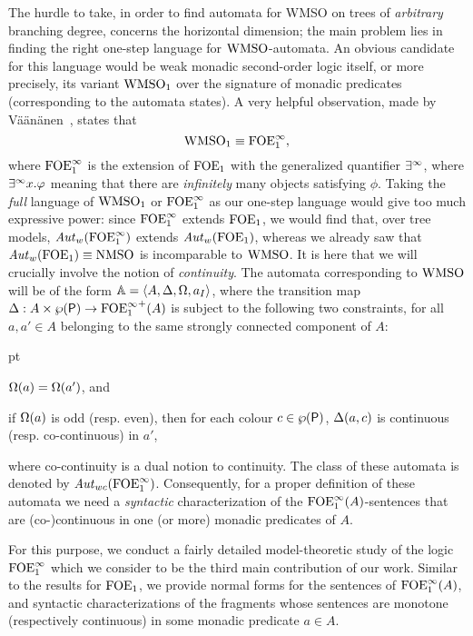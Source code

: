 The hurdle to take, in order to find automata for WMSO on trees of
\emph{arbitrary} branching degree, concerns the horizontal dimension; the
main problem lies in finding the right one-step language for
$\mathrm{WMSO}$-automata.
An obvious candidate for this language would be weak monadic second-order logic
itself, or more precisely, its variant $\mathrm{WMSO}_1$ over the signature of monadic
predicates (corresponding to the automata states).
A very helpful observation, made by V\"a\"an\"anen~\cite{vaananen77}, states that
\[
\mathrm{WMSO}_1 \equiv \mathrm{FOE}^{\infty}_1,
\]
where $\mathrm{FOE}^{\infty}_1$ is the extension of $\mathrm{FOE}_1$ with the generalized quantifier
$\exists^\infty$, where $\exists^\infty x. \varphi$ meaning that there are \emph{infinitely} many
objects satisfying $\phi$.
Taking the \emph{full} language of $\mathrm{WMSO}_1$ or $\mathrm{FOE}^{\infty}_1$ as our one-step language
would give too much expressive power: since $\mathrm{FOE}^{\infty}_1$ extends $\mathrm{FOE}_1$,
we would find that, over tree models, $\mathit{Aut}_{w}(\mathrm{FOE}^{\infty}_1)$ extends
$\mathit{Aut}_{w}(\mathrm{FOE}_1)$, whereas we already saw that $\mathit{Aut}_{w}(\mathrm{FOE}_1) \equiv
\mathrm{NMSO}$ is incomparable to $\mathrm{WMSO}$.
%
It is here that we will crucially involve the notion of \emph{continuity}.
The automata corresponding to $\mathrm{WMSO}$ will be of the form 
$\mathbb{A} = \langle{A, \Delta, \Omega, a_I}\rangle$,
where the transition map $\Delta: A \times \wp(\mathsf{P}) \to
{\ensuremath{\mathrm{FOE}^{\infty}_1}}^+(A)$ is subject to the following two constraints, for all $a,a' \in A$
belonging to the same strongly connected component of $A$:
\begin{description}
 pt
\item[(weakness)] $\Omega(a) = \Omega(a')$, and
\item[(continuity)]
if $\Omega(a)$ is odd (resp. even), then for each colour $c\in \wp(\mathsf{P})$,
   $\Delta(a,c)$ is continuous (resp. co-continuous) in $a'$,
\end{description}
where co-continuity is a dual notion to continuity.
The class of these automata is denoted by $\mathit{Aut}_{wc}(\mathrm{FOE}^{\infty}_1)$.
%
Consequently, for a proper definition of these automata we need a
\emph{syntactic} characterization of the $\mathrm{FOE}^{\infty}_1(A)$-sentences that are
(co-)continuous in one (or more) monadic predicates of $A$.

For this purpose, we conduct a fairly detailed model-theoretic study of the
logic $\mathrm{FOE}^{\infty}_1$ which we consider to be the third main
contribution of our work.
Similar to the results for $\mathrm{FOE}_1$, we provide normal forms for the
sentences of $\mathrm{FOE}^{\infty}_1(A)$, and syntactic characterizations of the fragments
whose sentences are monotone (respectively continuous) in some monadic predicate $a \in A$.


